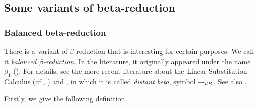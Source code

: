 \documentclass{article}
\theoremstyle{plain}
\theoremstyle{definition}
\newtheorem{Def}[The]{Definition}
\newtheorem{Exa}[The]{Example}
\begin{document}








\subsection{Some variants of beta-reduction}\label{SecVarBet}

\subsubsection{Balanced beta-reduction}

There is a variant of $\beta$-reduction that is interesting for certain purposes. We  call it {\em balanced $\beta$-reduction\/}. In the literature, it originally appeared under the name $\beta_1$ (\citealp{Ned73}). For details, see the more recent literature about the Linear Substitution Calculus (cf., \citealp{AccKes}) and \citealp{AccKes12}, in which it is called {\em distant beta\/}, symbol $\rightarrow_{dB}$. See also \citealp{BarBon}.

\smallskip

Firstly, we give the following definition.
\end{document}

